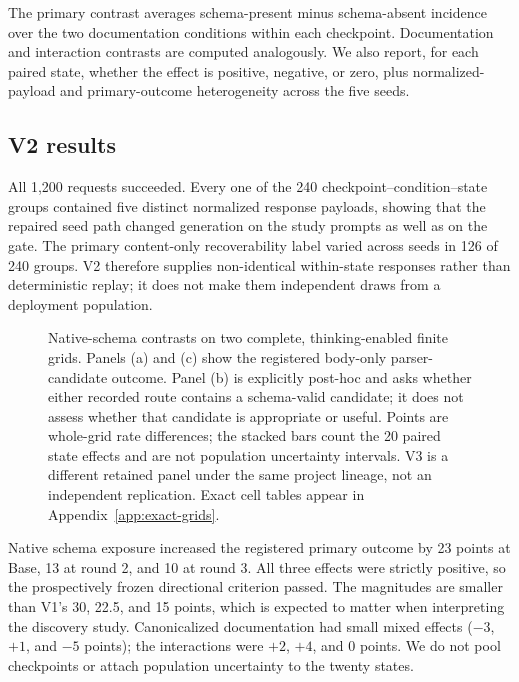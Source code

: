 \documentclass[10pt]{article}
\begin{document}
The primary contrast averages schema-present minus schema-absent incidence over
the two documentation conditions within each checkpoint. Documentation and
interaction contrasts are computed analogously. We also report, for each
paired state, whether the effect is positive, negative, or zero, plus
normalized-payload and primary-outcome heterogeneity across the five seeds.

\subsection{V2 results}

All 1,200 requests succeeded. Every one of the 240
checkpoint--condition--state groups contained five distinct normalized response
payloads, showing that the repaired seed path changed generation on the study
prompts as well as on the gate. The primary content-only recoverability label varied
across seeds in 126 of 240 groups. V2 therefore supplies non-identical
within-state responses rather than deterministic replay; it does not make them
independent draws from a deployment population.

\begin{figure}[t]
\centering
\PrimaryResultsFigure
\caption{Native-schema contrasts on two complete, thinking-enabled finite
grids. Panels (a) and (c) show the registered body-only parser-candidate
outcome. Panel (b) is explicitly post-hoc and asks whether either recorded
route contains a schema-valid candidate; it does not assess whether that
candidate is appropriate or useful. Points are whole-grid rate differences;
the stacked bars count the 20 paired state effects and are not population
uncertainty intervals. V3 is a different retained panel under the same project
lineage, not an independent replication. Exact cell tables appear in
Appendix~\ref{app:exact-grids}.}
\label{fig:interface-results}
\end{figure}

Native schema exposure increased the registered primary outcome by 23 points at
Base, 13 at round 2, and 10 at round 3. All three effects were strictly
positive, so the prospectively frozen directional criterion passed. The magnitudes are
smaller than V1's 30, 22.5, and 15 points, which is expected to matter when
interpreting the discovery study. Canonicalized documentation had small mixed
effects ($-3$, $+1$, and $-5$ points); the interactions were $+2$, $+4$, and
$0$ points. We do not pool checkpoints or attach population uncertainty to the
twenty states.
\end{document}
